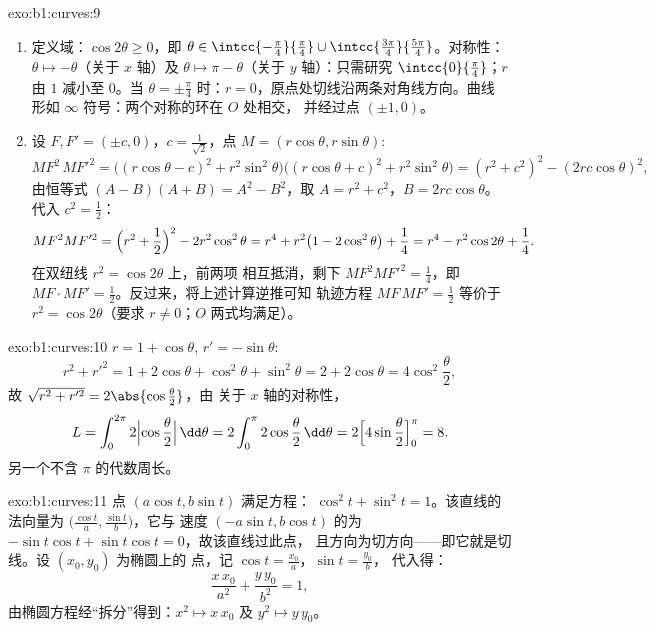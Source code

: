 \begin{solution}{exo:b1:curves:9}
\begin{enumerate}
  \item 定义域：$\cos 2\theta \geq 0$，即 $\theta \in
        \intcc{-\frac\pi4}{\frac\pi4} \cup
        \intcc{\frac{3\pi}{4}}{\frac{5\pi}{4}}$。对称性：$\theta
        \mapsto -\theta$（关于 $x$ 轴）及 $\theta \mapsto \pi -
        \theta$（关于 $y$ 轴）：只需研究 $\intcc{0}{\frac\pi4}$；$r$
        由 $1$ 减小至 $0$。当 $\theta = \pm\frac\pi4$ 时：$r =
        0$，原点处切线沿两条对角线方向。曲线
        形如 $\infty$ 符号：两个对称的环在 $O$ 处相交，
        并经过点 $(\pm 1, 0)$。
  \item 设 $F, F' = (\pm c, 0)$，$c = \frac{1}{\sqrt 2}$，点 $M
        = (r\cos\theta, r\sin\theta)$:
        \[
        MF^2\, MF'^2
        = \bigl((r\cos\theta - c)^2 + r^2\sin^2\theta\bigr)
        \bigl((r\cos\theta + c)^2 + r^2\sin^2\theta\bigr)
        = (r^2 + c^2)^2 - (2rc\cos\theta)^2 ,
        \]
        由恒等式 $(A - B)(A + B) = A^2 - B^2$，取 $A = r^2
        + c^2$，$B = 2rc\cos\theta$。代入 $c^2 = \frac12$：
        \[
        MF^2 MF'^2 = \Bigl(r^2 + \frac12\Bigr)^2 - 2r^2\cos^2\theta
        = r^4 + r^2\bigl(1 - 2\cos^2\theta\bigr) + \frac14
        = r^4 - r^2\cos 2\theta + \frac14 .
        \]
        在双纽线 $r^2 = \cos 2\theta$ 上，前两项
        相互抵消，剩下 $MF^2MF'^2 = \frac14$，即\ $MF \cdot MF' =
        \frac12$。反过来，将上述计算逆推可知
        轨迹方程 $MF\,MF' = \frac12$ 等价于 $r^2 = \cos
        2\theta$（要求 $r \neq 0$；$O$ 两式均满足）。
\end{enumerate}
\end{solution}

\begin{solution}{exo:b1:curves:10}
$r = 1 + \cos\theta$, $r' = -\sin\theta$:
\[
r^2 + r'^2 = 1 + 2\cos\theta + \cos^2\theta + \sin^2\theta
= 2 + 2\cos\theta = 4\cos^2\frac\theta2 ,
\]
故 $\sqrt{r^2 + r'^2} = 2\abs{\cos\frac\theta2}$，由
关于 $x$ 轴的对称性，
\[
L = \int_0^{2\pi} 2\Bigl|\cos\frac\theta2\Bigr|\,\dd\theta
= 2\int_0^{\pi} 2\cos\frac\theta2\,\dd\theta
= 2\Bigl[4\sin\frac\theta2\Bigr]_0^{\pi} = 8 .
\]
另一个不含 $\pi$ 的代数周长。
\end{solution}

\begin{solution}{exo:b1:curves:11}
点 $(a\cos t, b\sin t)$ 满足方程：
$\cos^2 t + \sin^2 t = 1$。该直线的法向量为
$\bigl(\frac{\cos t}a, \frac{\sin t}b\bigr)$，它与
速度 $(-a\sin t, b\cos t)$ 的为 $-\sin t\cos t +
\sin t\cos t = 0$，故该直线过此点，
且方向为切方向——即它就是切线。设 $(x_0, y_0)$ 为椭圆上的
点，记 $\cos t = \frac{x_0}a$，$\sin t = \frac{y_0}b$，
代入得：
\[
\frac{x\,x_0}{a^2} + \frac{y\,y_0}{b^2} = 1 ,
\]
由椭圆方程经“拆分”得到：$x^2 \mapsto
x\,x_0$ 及 $y^2 \mapsto y\,y_0$。
\end{solution}

